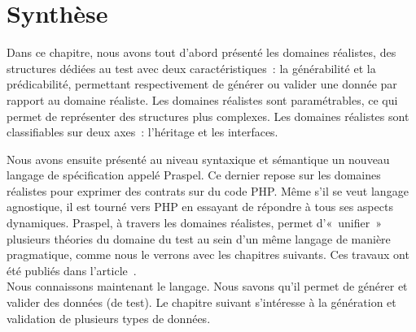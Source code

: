 \section{Synthèse}
\label{section:language:summary}

Dans ce chapitre, nous avons tout d'abord présenté les domaines réalistes, des
structures dédiées au test avec deux caractéristiques~: la générabilité et la
prédicabilité, permettant respectivement de générer ou valider une donnée par
rapport au domaine réaliste. Les domaines réalistes sont paramétrables, ce qui
permet de représenter des structures plus complexes. Les domaines réalistes sont
classifiables sur deux axes~: l'héritage et les interfaces.

Nous avons ensuite présenté au niveau syntaxique et sémantique un nouveau
langage de spécification appelé Praspel. Ce dernier repose sur les domaines
réalistes pour exprimer des contrats sur du code PHP. Même s'il se veut langage
agnostique, il est tourné vers PHP en essayant de répondre à tous ses aspects
dynamiques. Praspel, à travers les domaines réalistes, permet d'«~unifier~»
plusieurs théories du domaine du test au sein d'un même langage de manière
pragmatique, comme nous le verrons avec les chapitres suivants. Ces travaux ont
été publiés dans l'article~. \\

Nous connaissons maintenant le langage. Nous savons qu'il permet de générer et
valider des données (de test). Le chapitre suivant s'intéresse à la génération
et validation de plusieurs types de données.
